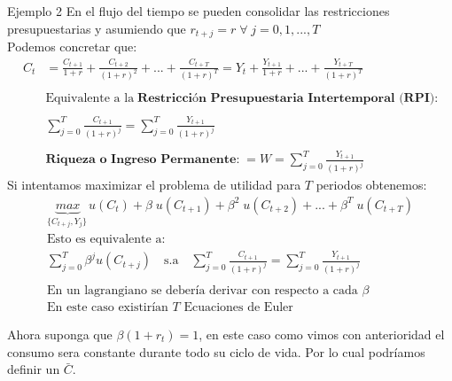 \documentclass[12pt]{article}
\begin{document}
    \begin{ejemplo}{Ejemplo 2}
        En el flujo del tiempo se pueden consolidar las restricciones presupuestarias y asumiendo que $r_{t+j}=r\; \forall\; j=0,1,...,T$ \\
        Podemos concretar que: 
        \begin{align*}
            C_t &=\frac{C_{t+1}}{1+r}+\frac{C_{t+2}}{(1+r)^2}+...+ \frac{C_{t+T}}{(1+r)^T}=Y_t+\frac{Y_{t+1}}{1+r}+...+\frac{Y_{t+T}}{(1+r)^T} \\\\
            &\text{Equivalente a la}\;\textbf{Restricción Presupuestaria Intertemporal (RPI):}\\\\
            &\sum^T_{j=0}\frac{C_{t+1}}{(1+r)^j}=\sum^T_{j=0}\frac{Y_{t+1}}{(1+r)^j}\\\\
            &\textbf{Riqueza o Ingreso Permanente:}\; =W=\sum^T_{j=0}\frac{Y_{t+1}}{(1+r)^j}
        \end{align*}
        Si intentamos maximizar el problema de utilidad para $T$ periodos obtenemos: 
        \begin{align*}
            \underbrace{max}_{ \{ C_{t+j},Y_j\}\ }  u(C_t) + \beta \;u(C_{t+1})+\beta^2 \;u(C_{t+2})+...+\beta^T \;u(C_{t+T})\\
            \text{Esto es equivalente a:}\\ \sum_{j=0}^T\beta^j u(C_{t+j})\quad \text{s.a}\quad \sum^T_{j=0}\frac{C_{t+1}}{(1+r)^j}=\sum^T_{j=0}\frac{Y_{t+1}}{(1+r)^j}\\\\
            \text{En un lagrangiano se debería derivar con respecto a cada $\beta$}\\ \text{En este caso existirían $T$ Ecuaciones de Euler}
        \end{align*}
    \end{ejemplo}
\newpage
Ahora suponga que $\beta(1+r_t)=1$, en este caso como vimos con anterioridad el consumo sera constante durante todo su ciclo de vida. Por lo cual podríamos definir un $\bar {C}$. 
\end{document}
